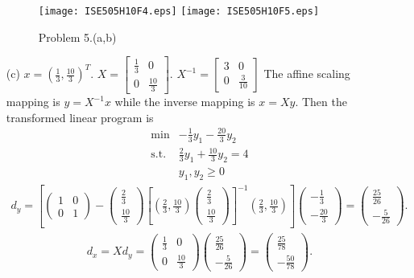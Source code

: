 \documentclass[11pt]{article}
\begin{document}
\begin{itemize}
		\begin{figure}[H]
			\centering
			\texttt{[image: ISE505H10F4.eps]}
			\texttt{[image: ISE505H10F5.eps]}
			\caption{Problem 5.(a,b)}
		\end{figure}
		
		
	\item[(c)] $x=(\frac{1}{3},\frac{10}{3})^T$. $X=\begin{bmatrix}\frac{1}{3} & 0 \\ 0 & \frac{10}{3}\end{bmatrix}$. $X^{-1}=\begin{bmatrix} 3 & 0 \\ 0 & \frac{3}{10} \end{bmatrix}$ The affine scaling mapping is $y=X^{-1}x$ while the inverse mapping is $x=Xy$. Then the transformed linear program is
	\begin{equation*}
	\begin{array}{ll}
	\min & -\frac{1}{3}y_1 - \frac{20}{3} y_2 \\
	\text{s.t.} & \frac{2}{3}y_1 + \frac{10}{3}y_2 = 4 \\
	& y_1,y_2 \geq 0
	\end{array}
	\end{equation*}
	\begin{align*}
	d_y=\left[  \left( \begin{array}{ll} 1& 0 \\ 0 & 1 \end{array}\right) - \left( \begin{array}{l} \frac{2}{3}\\ \frac{10}{3}\end{array}\right)\left[ (\frac{2}{3}, \frac{10}{3})\left( \begin{array}{l} \frac{2}{3}\\ \frac{10}{3} \end{array}\right)\right] ^{-1}(\frac{2}{3}, \frac{10}{3})\right]  \left( \begin{array}{c} -\frac{1}{3}\\- \frac{20}{3}\end{array}\right)=\left( \begin{array}{c} \frac{25}{26} \\ -\frac{5}{26} \end{array}\right).
	\end{align*}
	\begin{align*}
	d_x=Xd_y=\left( \begin{array}{ll} \frac{1}{3} & 0 \\ 0 & \frac{10}{3} \end{array}\right)\left( \begin{array}{c}  \frac{25}{26} \\ -\frac{5}{26}  \end{array}\right)=\left( \begin{array}{c}  \frac{25}{78} \\ -\frac{50}{78}  \end{array}\right).
	\end{align*}
	

\end{itemize}
\end{document}
